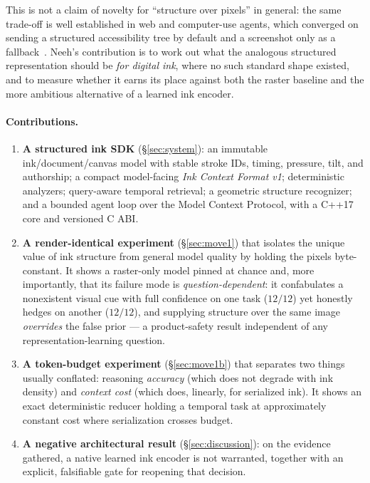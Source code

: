 \documentclass[11pt]{article}
\begin{document}
This is not a claim of novelty for ``structure over pixels'' in general: the same
trade-off is well established in web and computer-use agents, which converged on
sending a structured accessibility tree by default and a screenshot only as a
fallback~\cite{setofmark,omniparser,memgpt}. Neeh's contribution is to work out
what the analogous structured representation should be \emph{for digital ink},
where no such standard shape existed, and to measure whether it earns its place
against both the raster baseline and the more ambitious alternative of a learned
ink encoder.

\paragraph{Contributions.}
\begin{enumerate}[leftmargin=1.4em, itemsep=2pt]
\item \textbf{A structured ink SDK} (\S\ref{sec:system}): an immutable
  ink/document/canvas model with stable stroke IDs, timing, pressure, tilt, and
  authorship; a compact model-facing \emph{Ink Context Format v1}; deterministic
  analyzers; query-aware temporal retrieval; a geometric structure recognizer;
  and a bounded agent loop over the Model Context Protocol, with a C++17 core and
  versioned C ABI.
\item \textbf{A render-identical experiment} (\S\ref{sec:move1}) that isolates
  the unique value of ink structure from general model quality by holding the
  pixels byte-constant. It shows a raster-only model pinned at chance and, more
  importantly, that its failure mode is \emph{question-dependent}: it confabulates
  a nonexistent visual cue with full confidence on one task ($12/12$) yet honestly
  hedges on another ($12/12$), and supplying structure over the same image
  \emph{overrides} the false prior --- a product-safety result independent of any
  representation-learning question.
\item \textbf{A token-budget experiment} (\S\ref{sec:move1b}) that separates two
  things usually conflated: reasoning \emph{accuracy} (which does not degrade
  with ink density) and \emph{context cost} (which does, linearly, for
  serialized ink). It shows an exact deterministic reducer holding a temporal
  task at approximately constant cost where serialization crosses budget.
\item \textbf{A negative architectural result} (\S\ref{sec:discussion}): on the
  evidence gathered, a native learned ink encoder is not warranted, together
  with an explicit, falsifiable gate for reopening that decision.
\end{enumerate}
\end{document}
